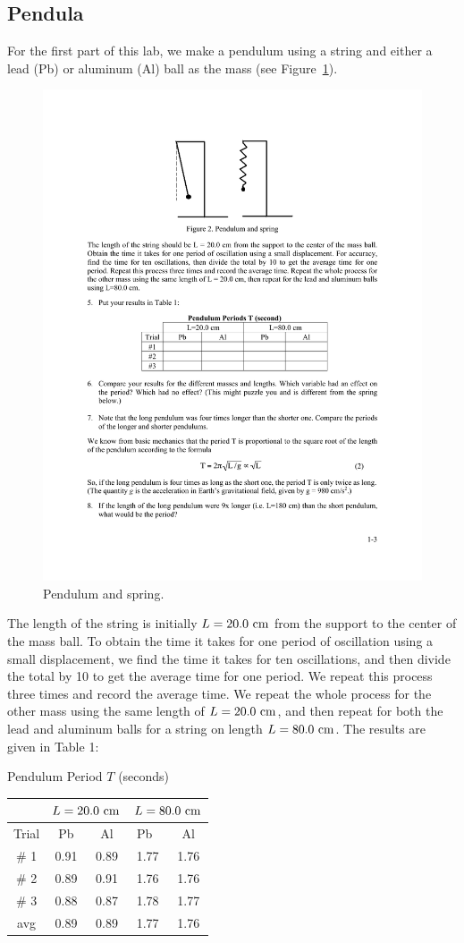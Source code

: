 \documentclass[11pt]{NSF}
\begin{document}
\subsection{Pendula}

For the first part of this lab, we make a pendulum using a 
string and either a lead (Pb) or aluminum (Al) ball as the
mass (see Figure~\ref{f:2}).
%
\begin{figure}[hbtp]
\begin{center}
\includegraphics[width=.4\textwidth]{fig1_2}
\caption{Pendulum and spring.}
\label{f:2}
\end{center}
\end{figure}
%
The length of the string is initially $L = 20.0~{\rm cm}$ 
from the support to the center of the mass ball. 
To obtain the time it takes for one period of 
oscillation using a small displacement, we find the 
time it takes for ten oscillations, and then divide 
the total by 10 to get the average time for one period. 
We repeat this process three times and record the average time. 
We repeat the whole process for the other mass using 
the same length of $L = 20.0~{\rm cm}$, and 
then repeat for both the lead and aluminum balls for a
string on length $L=80.0~{\rm cm}$.
The results are given in Table 1:
%
\begin{table}[hbtp]
\begin{center}
Pendulum Period $T$ (seconds)\\
\begin{tabular}{| c | c | c | c | c | }
\hline
&\multicolumn{2}{c}{$L=20.0~{\rm cm}$} \vrule
&\multicolumn{2}{c}{$L=80.0~{\rm cm}$} \vrule\\
\hline
Trial & \phantom{ }Pb\phantom{ } & Al & \phantom{ }Pb\phantom{ }\  & Al \\
\hline
\# 1 & 0.91 & 0.89 & 1.77 & 1.76 \\
\hline
\# 2 & 0.89 & 0.91 & 1.76 & 1.76 \\
\hline
\# 3 & 0.88 & 0.87 & 1.78 & 1.77 \\
\hline
avg  & 0.89 & 0.89 & 1.77 & 1.76 \\
\hline
\end{tabular}
\label{t:1}
\end{center}
\end{table}
\end{document}
